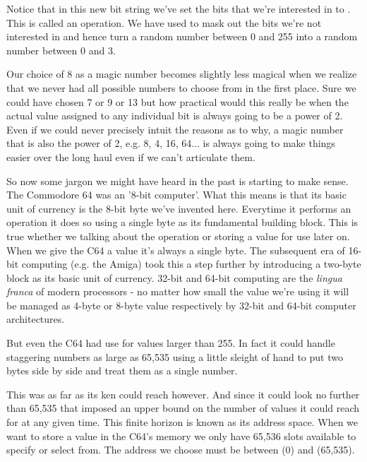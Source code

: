 Notice that in this new bit string we've set the bits that we're interested in
to .  This is called an  operation. We have used
 to mask out the bits we're not interested in and hence turn a
random number between 0 and 255 into a random number between 0 and 3.

Our choice of 8 as a magic number becomes slightly less magical when we realize
that we never had all possible numbers to choose from in the first place. Sure
we could have chosen 7 or 9 or 13 but how practical would this really be when
the actual value assigned to any individual bit is always going to be a power of
2. Even if we could never precisely intuit the reasons as to why, a magic number
that is also the power of 2, e.g. 8, 4, 16, 64... is always going to make things easier
over the long haul even if we can't articulate them.

So now some jargon we might have heard in the past is starting to make sense. The
Commodore 64 was an '8-bit computer'. What this means is that its basic unit of
currency is the 8-bit byte we've invented here. Everytime it performs an operation
it does so using a single byte as its fundamental building block. This is true 
whether we talking about the  operation or storing a value for use
later on. When we give the C64 a value it's always a single byte. The subsequent
era of 16-bit computing (e.g. the Amiga) took this a step further by introducing
a two-byte block as its basic unit of currency. 32-bit and 64-bit computing are the
\textit{lingua franca} of modern processors - no matter how small the value we're using it
will be managed as 4-byte or 8-byte value respectively by 32-bit and 64-bit
computer architectures.

But even the C64 had use for values larger than 255. In fact it could handle staggering
numbers as large as 65,535 using a little sleight of hand to put two bytes side by side
and treat them as a single number.

This was as far as its ken could reach however. And since it could look no further than
65,535 that imposed an upper bound on the number of values it could reach for at any given
time. This finite horizon is known as its address space. When we want to store a value
in the C64's memory we only have 65,536 slots available to specify or select from. The
address we choose must be between  (0) and  (65,535).

